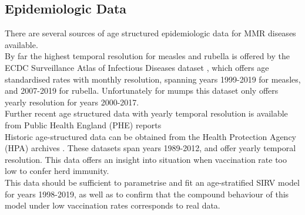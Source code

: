 \documentclass{article}
\theoremstyle{definition}
\begin{document}
\subsection{Epidemiologic Data}
There are several sources of age structured epidemiologic data for MMR diseases available.\\ By far the highest temporal resolution for measles and rubella is offered by the ECDC Surveillance Atlas of Infectious Diseases dataset \cite{noauthor_surveillance_nodate}, which offers age standardised rates with monthly resolution, spanning years 1999-2019 for measles, and 2007-2019 for rubella. Unfortunately for mumps this dataset only offers yearly resolution for years 2000-2017.\\
Further recent age structured data with yearly temporal resolution is available from Public Health England (PHE) reports \cite{noauthor_confirmed_nodate,noauthor_mumps_nodate,noauthor_rubella_nodate}\\
Historic age-structured data can be obtained from the Health Protection Agency (HPA) archives \cite{noauthor_archived_nodate,noauthor_archived_nodate-1,noauthor_archived_nodate-2}. These datasets span years 1989-2012, and offer yearly temporal resolution. This data offers an insight into situation when vaccination rate too low to confer herd immunity.\\
This data should be sufficient to parametrise and fit an age-stratified SIRV model for years 1998-2019, as well as to confirm that the compound behaviour of this model under low vaccination rates corresponds to real data.
\end{document}
